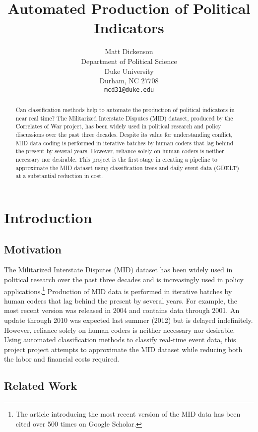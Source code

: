 \documentclass[12pt,letterpaper]{article} %
\title{Automated Production of Political Indicators}
\author{
Matt Dickenson\\
Department of Political Science\\
Duke University\\
Durham, NC 27708 \\
\texttt{mcd31@duke.edu}
}
\begin{document}
\maketitle

\begin{abstract}
Can classification methods help to automate the production of political indicators in near real time? The Militarized Interstate Disputes (MID) dataset, produced by the Correlates of War project, has been widely used in political research and policy discussions over the past three decades. Despite its value for understanding conflict, MID data coding is performed in iterative batches by human coders that lag behind the present by several years. However, reliance solely on human coders is neither necessary nor desirable. This project is the first stage in creating a pipeline to approximate the MID dataset using classification trees and daily event data (GDELT) at a substantial reduction in cost. 
\end{abstract}


\section{Introduction}

\subsection{Motivation}

The Militarized Interstate Disputes (MID) dataset has been widely used in political research over the past three decades and is increasingly used in policy applications.\footnote{The article introducing the most recent version of the MID data has been cited over 500 times on Google Scholar.} Production of MID data is performed in iterative batches by human coders that lag behind the present by several years. For example, the most recent version was released in 2004 and contains data through 2001. An update through 2010 was expected last summer (2012) but is delayed indefinitely. However, reliance solely on human coders is neither necessary nor desirable. Using automated classification methods to classify real-time event data, this project project attempts to approximate the MID dataset while reducing both the labor and financial costs required.

\subsection{Related Work}
\end{document}
